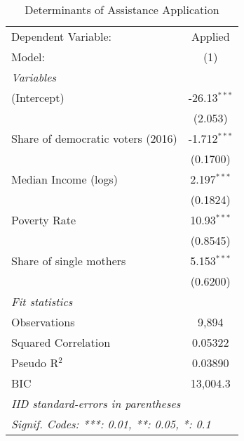 
\begin{table}[htbp]
   \centering
   \caption{\label{ResultsLogit} Determinants of Assistance Application}
   \begin{tabular}{lc}
      \tabularnewline\midrule\midrule
      Dependent Variable:               & Applied\\
      Model:                            & (1)\\
      \midrule \emph{Variables} &  \\
      (Intercept)                       & -26.13$^{***}$\\
                                        & (2.053)\\
      Share of democratic voters (2016) & -1.712$^{***}$\\
                                        & (0.1700)\\
      Median Income (logs)              & 2.197$^{***}$\\
                                        & (0.1824)\\
      Poverty Rate                      & 10.93$^{***}$\\
                                        & (0.8545)\\
      Share of single mothers           & 5.153$^{***}$\\
                                        & (0.6200)\\
      \midrule \emph{Fit statistics} &  \\
      Observations                      & 9,894\\
      Squared Correlation               & 0.05322\\
      Pseudo R$^2$                      & 0.03890\\
      BIC                               & 13,004.3\\
      \midrule\midrule\multicolumn{2}{l}{\emph{IID standard-errors in parentheses}}\\
      \multicolumn{2}{l}{\emph{Signif. Codes: ***: 0.01, **: 0.05, *: 0.1}}\\
   \end{tabular}
\end{table}


